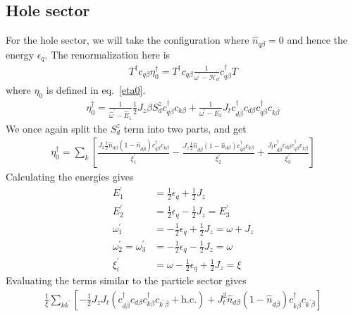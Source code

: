 \documentclass[twoside]{report}
\numberwithin{equation}{section}
\begin{document}
\subsection{Hole sector}
For the hole sector, we will take the configuration where \(\hat n_{q\beta} = 0\) and hence the energy \(\epsilon_q\). The renormalization here is
\begin{equation}\begin{aligned}
	T^\dagger c_{q\beta}\eta^\dagger_0 = T^\dagger c_{q\beta}\frac{1}{\omega^\prime - \mathcal{H}_d}c^\dagger_{q\beta} T
\end{aligned}\end{equation}
where \(\eta_0\) is defined in eq.~\ref{eta0}.
\begin{equation}\begin{aligned}
	\label{holeomega}
	\eta_0^\dagger = \frac{1}{\hat \omega^\prime - \hat E_1}\frac{1}{2}J_z \beta S_d^z c^\dagger_{q\beta}c_{k\beta} + \frac{1}{\omega^\prime - E_3}J_tc^\dagger_{d\overline\beta}c_{d\beta}c^\dagger_{q\beta}c_{k\overline\beta}
\end{aligned}\end{equation}
We once again split the \(S_d^z\) term into two parts, and get
\begin{equation}\begin{aligned}
	\eta^\dagger_0 = \sum_k \left[\frac{ J_z \frac{1}{2}\hat n_{d\beta}\left( 1 - \hat n_{d\overline\beta} \right) c^\dagger_{q\beta}c_{k\beta}}{\xi^\prime_1} - \frac{J_z \frac{1}{2}\hat n_{d\overline\beta}\left( 1 - \hat n_{d\beta} \right) c^\dagger_{q\beta}c_{k\beta}}{\xi^\prime_2} + \frac{J_t  c^\dagger_{d\overline\beta}c_{d\beta} c^\dagger_{q\beta}c_{k\overline\beta}}{\xi^\prime_3}\right] 
\end{aligned}\end{equation}
Calculating the energies gives
\begin{equation}\begin{aligned}
	E^\prime_1 &= \frac{1}{2}\epsilon_q + \frac{1}{2}J_z\\
	E^\prime_2 &= \frac{1}{2}\epsilon_q - \frac{1}{2}J_z = E^\prime_3\\
	\omega^\prime_1 &= - \frac{1}{2}\epsilon_q + \frac{1}{2}J_z = \omega + J_z\\
	\omega^\prime_2 = \omega^\prime_3 &= - \frac{1}{2}\epsilon_q - \frac{1}{2}J_z = \omega\\
	\xi_i^\prime &= \omega - \frac{1}{2}\epsilon_q + \frac{1}{2}J_z = \xi
\end{aligned}\end{equation}
Evaluating the terms similar to the particle sector gives
\begin{equation}\begin{aligned}
	\label{kondo_hole}
	\frac{1}{\xi}\sum_{kk^\prime} \left[ -\frac{1}{2} J_z J_t\left(c^\dagger_{d\overline\beta}c_{d\beta}c^\dagger_{k\beta}c_{k^\prime\overline\beta} + \text{h.c.}\right) + J_t^2 \hat n_{d\beta}\left(1 - \hat n_{d\overline\beta}\right) c^\dagger_{k\overline\beta}c_{k^\prime\overline\beta}\right]
\end{aligned}\end{equation}
\end{document}
